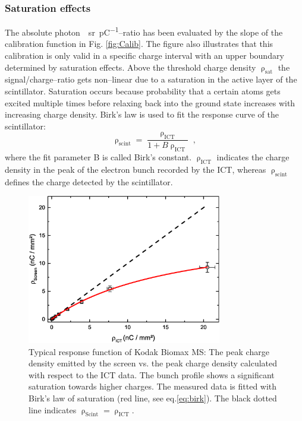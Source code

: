 \documentclass[%
preprint,
amsmath,
amssymb,
aip,
rsi, 
numerical,
floatfix,
]{revtex4-1}
\begin{document}
\subsubsection{\label{Se}Saturation effects}
The absolute \si{photon \per \steradian \per \pico\coulomb}--ratio has been evaluated by the slope of the calibration function in Fig. \ref{fig:Calib}. 
The figure also illustrates that this calibration is only valid in a specific charge interval with an upper boundary determined by saturation effects. 
Above the threshold charge density $\uprho_{\text{sat}}$ the signal/charge--ratio gets non--linear due to a saturation in the active layer of the scintillator.
Saturation occurs because probability that a certain atoms gets excited multiple times before relaxing back into the ground state increases with increasing charge density.
Birk’s law is used to fit the response curve of the scintillator:
\begin{equation}
\uprho_{\text{scint}} = \frac{\uprho_{\text{ICT}}}{1+B\uprho_{\text{ICT}}}{\;,}
\label{eq:birk}
\end{equation}
where the fit parameter B is called Birk's constant.
$\uprho_{\text{ICT}}$ indicates the charge density in the peak of the electron bunch recorded by the ICT, whereas $\uprho_{\text{scint}}$ defines the charge detected by the scintillator.
\begin{figure}
\includegraphics[width=8.5cm]{./Figures/Sat}%
\caption{\label{fig:Sat} Typical response function of Kodak Biomax MS: The peak charge density emitted by the screen vs. the peak charge density calculated with respect to the ICT data. 
The bunch profile shows a significant saturation towards higher charges. 
The measured data is fitted with Birk's law of saturation (red line, see eq.\ref{eq:birk}). 
The black dotted line indicates $\uprho_{\text{Scint}} = \uprho_{\text{ICT}}$.}
\end{figure}
\end{document}
